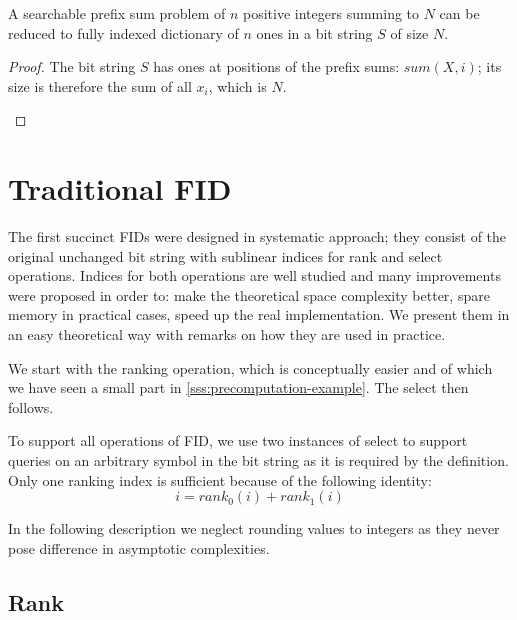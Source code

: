 \begin{lemma}\label{l:sps}
	A searchable prefix sum problem of $n$ positive integers summing to $N$ can be reduced to fully indexed dictionary of $n$ ones in a bit string $S$ of size $N$.
\end{lemma}
\begin{proof}
	The bit string $S$ has ones at positions of the prefix sums: $sum(X, i)$; its size is therefore the sum of all $x_i$, which is $N$.
	\begin{algorithmic}
		\State {}
	\EndFunction
	\end{algorithmic}
	
	\begin{algorithmic}
	\Function{leq}{$S, n$}
		\State \Return{$rank_1(S, succ_1(S, i))$}
	\EndFunction
	\end{algorithmic}
\end{proof}

\section{Traditional FID}

The first succinct FIDs were designed in systematic approach; they consist of the original unchanged bit string with sublinear indices for rank and select operations.
Indices for both operations are well studied and many improvements were proposed in order to: make the theoretical space complexity better, spare memory in practical cases, speed up the real implementation.
We present them in an easy theoretical way with remarks on how they are used in practice.

We start with the ranking operation, which is conceptually easier and of which we have seen a small part in \ref{sss:precomputation-example}.
The select then follows.

To support all operations of FID, we use two instances of select to support queries on an arbitrary symbol in the bit string as it is required by the definition.
Only one ranking index is sufficient because of the following identity:
$$ i = rank_0(i) + rank_1(i) $$

In the following description we neglect rounding values to integers as they never pose difference in asymptotic complexities.

\subsection{Rank}

